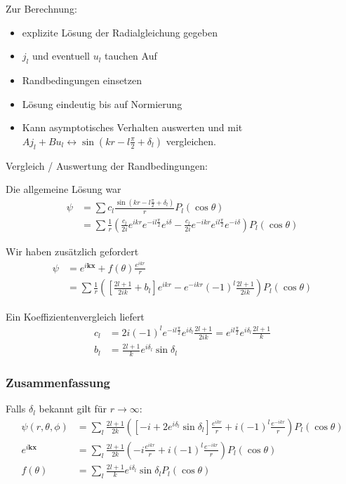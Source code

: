 \documentclass[11pt,a4paper]{report}
\begin{document}
Zur Berechnung:
\begin{itemize}
    \item explizite Lösung der Radialgleichung gegeben
    \item $j_l$ und eventuell $u_l$ tauchen Auf
    \item Randbedingungen einsetzen
    \item Lösung eindeutig bis auf Normierung
    \item Kann asymptotisches Verhalten auswerten und mit $A j_l + B u_l \leftrightarrow \sin \left( k r - l \frac{\pi}{2} + \delta_l\right)$ vergleichen.
\end{itemize}

Vergleich / Auswertung der Randbedingungen:

Die allgemeine Lösung war
\begin{align*}
    \psi &= \sum c_l \frac{\sin \left(k r - l \frac{\pi}{2} + \delta_l \right)}{r} P_l(\cos \theta) \\
    &= \sum \frac{1}{r} \left(\frac{c_l}{2 i} e^{i k r} e^{-i l \frac{\pi}{2}} e^{i \delta} - \frac{c_l}{2 i} e^{-i k r} e^{i l \frac{\pi}{2}} e^{-i \delta}\right) P_l (\cos \theta)     
\end{align*}

Wir haben zusätzlich gefordert
\begin{align*}
    \psi &= e^{i \mathbf{k} \mathbf{x}} + f(\theta) \frac{e^{i k r}}{r} \\
    &= \sum \frac{1}{r} \left(\left[ \frac{2 l + 1}{2 i k} + b_l \right] e^{i k r} - e^{-i k r} (-1)^l \frac{2 l + 1} {2 i k}\right) P_l(\cos \theta)
\end{align*}

Ein Koeffizientenvergleich liefert 
\begin{align*}
    c_l &= 2 i (-1)^l e^{-i l \frac{\pi}{2}} e^{i \delta_l} \frac{2 l + 1}{2 i k} = e^{i l \frac{\pi}{2}} e^{i \delta_l} \frac{2 l + 1}{k} \\
    b_l &= \frac{2 l + 1}{k} e^{i \delta_l} \sin \delta_l
\end{align*}

\subsubsection{Zusammenfassung}

Falls $\delta_l$ bekannt gilt für $r \rightarrow \infty$:
\begin{align*}
    \psi(r, \theta, \phi) &= \sum_l \frac{2 l + 1}{2 k} \left( \left[ -i + 2 e^{i \delta_l} \sin \delta_l \right] \frac{e^{i k r}}{r} + i (-1)^l \frac{e^{-i k r}}{r}\right) P_l(\cos \theta) \\
    e^{i \mathbf{k} \mathbf{x}} &= \sum_l \frac{2 l + 1}{2 k} \left( -i \frac{e^{i k r}}{r} + i (-1)^l \frac{e^{-i k r}}{r}\right) P_l(\cos \theta) \\
    f(\theta) &= \sum_l \frac{2 l + 1}{ k}  e^{i \delta_l} \sin \delta_l  P_l(\cos \theta) 
\end{align*}
\end{document}
